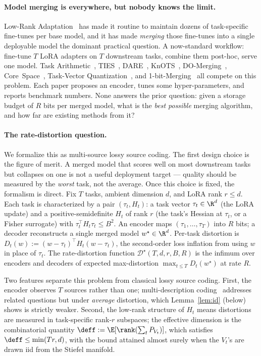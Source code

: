 \paragraph{Model merging is everywhere, but nobody knows the
limit.} Low-Rank Adaptation~\cite{hu2022lora} has made it routine
to maintain dozens of task-specific fine-tunes per base model,
and it has made \emph{merging} those fine-tunes into a single
deployable model the dominant practical question. A now-standard
workflow: fine-tune $T$ LoRA adapters on $T$ downstream tasks,
combine them post-hoc, serve one model. Task
Arithmetic~\cite{ilharco2023task},
TIES~\cite{yadav2023ties}, DARE~\cite{yu2024dare},
KnOTS~\cite{stoica2025knots},
DO-Merging~\cite{domerging2025},
Core~Space~\cite{panariello2025core},
Task-Vector Quantization~\cite{kim2025tvq},
and 1-bit-Merging~\cite{bit1merging2025} all compete on this
problem. Each paper proposes an encoder, tunes some
hyper-parameters, and reports benchmark numbers. None answers
the prior question: given a storage budget of $R$ bits per
merged model, what is the \emph{best possible} merging
algorithm, and how far are existing methods from it?

\paragraph{The rate-distortion question.} We formalize this as
multi-source lossy source coding. The first design choice is
the figure of merit. A merged model that scores well on most
downstream tasks but collapses on one is not a useful
deployment target — quality should be measured by the
\emph{worst} task, not the average. Once this choice is fixed,
the formalism is direct. Fix $T$ tasks, ambient dimension $d$,
and LoRA rank $r\leq d$. Each task is characterized by a pair
$(\tau_t, H_t)$: a task vector $\tau_t\in\R^d$ (the LoRA
update) and a positive-semidefinite $H_t$ of rank $r$ (the
task's Hessian at $\tau_t$, or a Fisher surrogate) with
$\tau_t^\top H_t\tau_t\leq B^2$. An encoder maps
$(\tau_1,\ldots,\tau_T)$ into $R$ bits; a decoder reconstructs
a single merged model $w^\star\in\R^d$. Per-task distortion is
$D_t(w) := (w-\tau_t)^\top H_t (w-\tau_t)$, the second-order
loss inflation from using $w$ in place of $\tau_t$. The
rate-distortion function $\mathcal{D}^\star(T,d,r,B,R)$ is
the infimum over encoders and decoders of expected
max-distortion $\max_{t\leq T} D_t(w^\star)$ at rate $R$.

Two features separate this problem from classical lossy
source coding. First, the encoder observes $T$ sources rather
than one; multi-description coding~\cite{elgamalcover1982md}
addresses related questions but under \emph{average} distortion,
which Lemma~\ref{lem:id} (below) shows is strictly weaker.
Second, the low-rank structure of $H_t$ means distortions are
measured in task-specific rank-$r$ subspaces; the effective
dimension is the combinatorial quantity $\deff := \E[\rank
(\sum_t P_{V_t})]$, which satisfies $\deff \leq \min(Tr, d)$,
with the bound attained almost surely when the $V_t$'s are
drawn iid from the Stiefel manifold.


